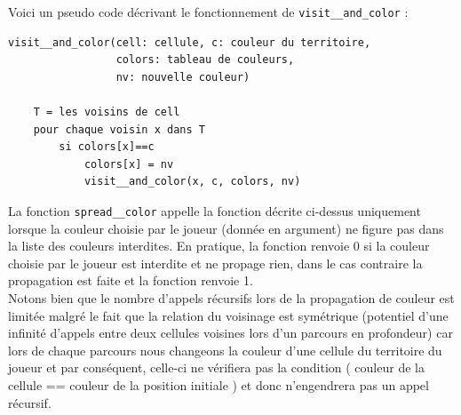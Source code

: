 \documentclass[11pt]{article}
\begin{document}
Voici un pseudo code décrivant le fonctionnement de \texttt{visit\_\_and\_color} :\\
\begin{lstlisting}
visit__and_color(cell: cellule, c: couleur du territoire,
                 colors: tableau de couleurs,
                 nv: nouvelle couleur) 
                 
    T = les voisins de cell
    pour chaque voisin x dans T
        si colors[x]==c
            colors[x] = nv
            visit__and_color(x, c, colors, nv)
\end{lstlisting}

La fonction \texttt{spread\_\_color} appelle la fonction décrite ci-dessus uniquement lorsque la couleur choisie par le joueur (donnée en argument) ne figure pas dans la liste des couleurs interdites. En pratique, la fonction renvoie 0 si la couleur choisie par le joueur est interdite et ne propage rien, dans le cas contraire la propagation est faite et la fonction renvoie 1.\\ 


Notons bien que le nombre d'appels récursifs lors de la propagation de couleur est limitée malgré le fait que la relation du voisinage est symétrique (potentiel d'une infinité d'appels entre deux cellules voisines lors d'un parcours en profondeur) car lors de chaque parcours nous changeons la couleur d'une cellule du territoire du joueur et par conséquent, celle-ci ne vérifiera pas la condition ( couleur de la cellule == couleur de la position initiale ) et donc n'engendrera pas un appel récursif. \\
\end{document}
